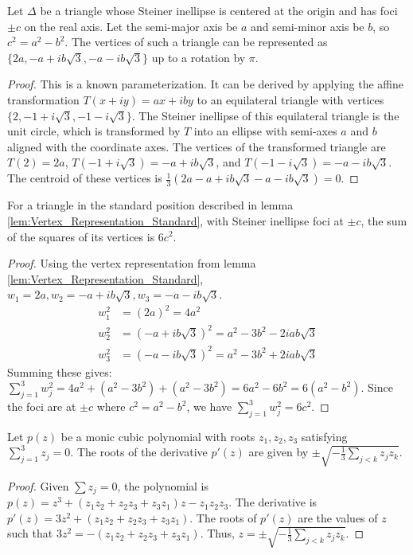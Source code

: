 \begin{lemma}
    \label{lem:Vertex_Representation_Standard}
    Let $\Delta$ be a triangle whose Steiner inellipse is centered at the origin and has foci $\pm c$ on the real axis. Let the semi-major axis be $a$ and semi-minor axis be $b$, so $c^2=a^2-b^2$. The vertices of such a triangle can be represented as $\{2a, -a+ib\sqrt{3}, -a-ib\sqrt{3}\}$ up to a rotation by $\pi$.
\end{lemma}
\begin{proof}
    This is a known parameterization. It can be derived by applying the affine transformation $T(x+iy) = ax+iby$ to an equilateral triangle with vertices $\{2, -1+i\sqrt{3}, -1-i\sqrt{3}\}$. The Steiner inellipse of this equilateral triangle is the unit circle, which is transformed by $T$ into an ellipse with semi-axes $a$ and $b$ aligned with the coordinate axes. The vertices of the transformed triangle are $T(2) = 2a$, $T(-1+i\sqrt{3}) = -a+ib\sqrt{3}$, and $T(-1-i\sqrt{3}) = -a-ib\sqrt{3}$. The centroid of these vertices is $\frac{1}{3}(2a -a+ib\sqrt{3} -a-ib\sqrt{3}) = 0$.
\end{proof}

\begin{lemma}
    \label{lem:Sum_Squared_Vertices_Standard}
    For a triangle in the standard position described in lemma \ref{lem:Vertex_Representation_Standard}, with Steiner inellipse foci at $\pm c$, the sum of the squares of its vertices is $6c^2$.
\end{lemma}
\begin{proof}
    Using the vertex representation from lemma \ref{lem:Vertex_Representation_Standard}, $w_1=2a, w_2=-a+ib\sqrt{3}, w_3=-a-ib\sqrt{3}$.
    \begin{align*}
        w_1^2 &= (2a)^2 = 4a^2 \\
        w_2^2 &= (-a+ib\sqrt{3})^2 = a^2 - 3b^2 - 2iab\sqrt{3} \\
        w_3^2 &= (-a-ib\sqrt{3})^2 = a^2 - 3b^2 + 2iab\sqrt{3}
    \end{align*}
    Summing these gives:
    $\sum_{j=1}^3 w_j^2 = 4a^2 + (a^2 - 3b^2) + (a^2 - 3b^2) = 6a^2 - 6b^2 = 6(a^2-b^2)$.
    Since the foci are at $\pm c$ where $c^2=a^2-b^2$, we have $\sum_{j=1}^3 w_j^2 = 6c^2$.
\end{proof}

\begin{lemma}
    \label{lem:Vieta_Centered}
    Let $p(z)$ be a monic cubic polynomial with roots $z_1, z_2, z_3$ satisfying $\sum_{j=1}^3 z_j = 0$. The roots of the derivative $p'(z)$ are given by $\pm\sqrt{-\frac{1}{3}\sum_{j<k} z_j z_k}$.
\end{lemma}
\begin{proof}
    Given $\sum z_j = 0$, the polynomial is $p(z) = z^3 + (z_1z_2+z_2z_3+z_3z_1)z - z_1z_2z_3$.
    The derivative is $p'(z) = 3z^2 + (z_1z_2+z_2z_3+z_3z_1)$. The roots of $p'(z)$ are the values of $z$ such that $3z^2 = -(z_1z_2+z_2z_3+z_3z_1)$.
    Thus, $z = \pm\sqrt{-\frac{1}{3}\sum_{j<k} z_j z_k}$.
\end{proof}

